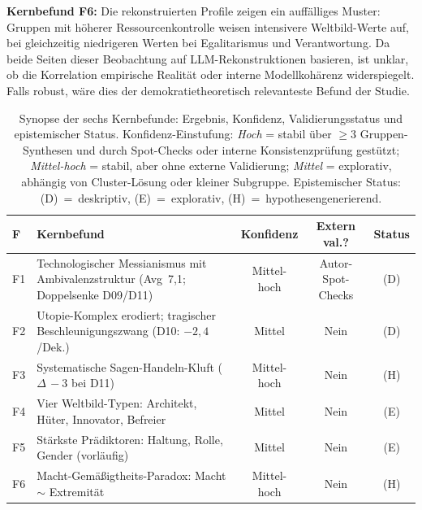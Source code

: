 \documentclass[12pt,a4paper]{article}
\begin{document}
\medskip
\noindent\textbf{Kernbefund F6:} Die rekonstruierten Profile zeigen ein auff\"alliges Muster: Gruppen mit h\"oherer Ressourcenkontrolle weisen intensivere Weltbild-Werte auf, bei gleichzeitig niedrigeren Werten bei Egalitarismus und Verantwortung. Da beide Seiten dieser Beobachtung auf LLM-Rekonstruktionen basieren, ist unklar, ob die Korrelation empirische Realit\"at oder interne Modellkoh\"arenz widerspiegelt. Falls robust, w\"are dies der demokratietheoretisch relevanteste Befund der Studie.



\begin{table}[htbp]
  \centering
  \caption{Synopse der sechs Kernbefunde: Ergebnis, Konfidenz, Validierungsstatus und epistemischer Status. Konfidenz-Einstufung: \emph{Hoch} = stabil \"uber $\geq 3$ Gruppen-Synthesen und durch Spot-Checks oder interne Konsistenzpr\"ufung gest\"utzt; \emph{Mittel-hoch} = stabil, aber ohne externe Validierung; \emph{Mittel} = explorativ, abh\"angig von Cluster-L\"osung oder kleiner Subgruppe. Epistemischer Status: (D)~=~deskriptiv, (E)~=~explorativ, (H)~=~hypothesengenerierend.}
  \label{tab:synopse}
  \footnotesize
  \begin{tabularx}{\textwidth}{l X c c c}
    \toprule
    \textbf{F} & \textbf{Kernbefund} & \textbf{Konfidenz} & \textbf{Extern val.?} & \textbf{Status} \\
    \midrule
    F1 & Technologischer Messianismus mit Ambivalenzstruktur (Avg~7,1; Doppelsenke D09/D11) & Mittel-hoch & Autor-Spot-Checks & (D) \\
    F2 & Utopie-Komplex erodiert; tragischer Beschleunigungszwang (D10: $-2{,}4$/Dek.) & Mittel & Nein & (D) \\
    F3 & Systematische Sagen-Handeln-Kluft ($\Delta\,-3$ bei D11) & Mittel-hoch & Nein & (H) \\
    F4 & Vier Weltbild-Typen: Architekt, H\"uter, Innovator, Befreier & Mittel & Nein & (E) \\
    F5 & St\"arkste Pr\"adiktoren: Haltung, Rolle, Gender (vorl\"aufig) & Mittel & Nein & (E) \\
    F6 & Macht-Gem\"a\ss{}igtheits-Paradox: Macht $\sim$ Extremit\"at & Mittel-hoch & Nein & (H) \\
    \bottomrule
  \end{tabularx}
\end{table}
\end{document}
